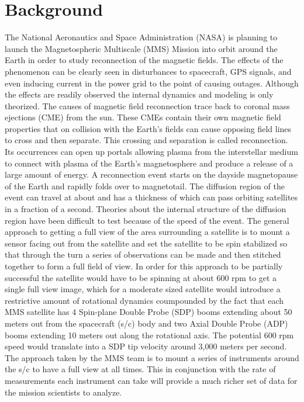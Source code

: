 
\chapter{Background}
\label{chap:Background}

The National Aeronautics and Space Administration (NASA) is planning to launch the Magnetospheric Multiscale (MMS) Mission into orbit around the Earth in order to study reconnection of the magnetic fields.  The effects of the phenomenon can be clearly seen in disturbances to spacecraft, GPS signals, and even inducing current in the power grid to the point of causing outages.  Although the effects are readily observed the internal dynamics and modeling is only theorized.  The causes of magnetic field reconnection trace back to coronal mass ejections (CME) from the sun.  These CMEs contain their own magnetic field properties that on collision with the Earth's fields can cause opposing field lines to cross and then separate.  This crossing and separation is called reconnection.  Its occurrences can open up portals allowing plasma from the interstellar medium to connect with plasma of the Earth's magnetosphere and produce a release of a large amount of energy.  A reconnection event starts on the dayside magnetopause of the Earth and
rapidly folds over to magnetotail.  The diffusion region of the event can travel at about  and has a thickness of  which can pass orbiting satellites in a fraction of a second.  Theories about the internal structure of the diffusion region  have been difficult to test because of the speed of the event.  The general approach to getting a full view of the area surrounding a satellite is to mount a sensor facing out from the satellite and set the satellite to be spin stabilized so that through the turn a series of observations can be made and then stitched together to form a full field of view.  In order for this approach to be partially successful the satellite would have to be spinning at about 600 rpm to get a single full view image, which for a moderate sized satellite would introduce a restrictive amount of rotational dynamics coumpounded by the fact that each MMS satellite has 4 Spin-plane Double Probe (SDP) booms  extending about 50 meters out from the spacecraft (s/c) body and two Axial Double Probe (ADP) booms extending 10 meters out along the rotational axis.  The potential 600 rpm speed would translate into a SDP tip velocity around 3,000 meters per second.
The approach taken by the MMS team is to mount a series of instruments around the s/c to have a full view at all times.  This in conjunction with the rate of measurements each instrument can take will provide a much richer set of data for the mission scientists to analyze.
